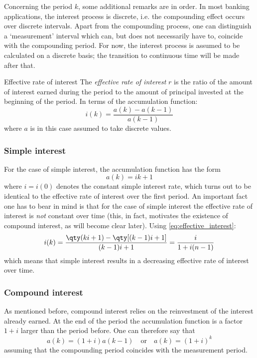 Concerning the period \(k\), some additional remarks are in order. In most banking applications, the interest process is discrete, i.e. the compounding effect occurs over discrete intervals. Apart from the compounding process, one can distinguish a `measurement' interval which can, but does not necessarily have to, coincide with the compounding period. For now, the interest process is assumed to be calculated on a discrete basis; the transition to continuous time will be made after that.

\begin{thmblock}{Effective rate of interest}
    The \emph{effective rate of interest} \(r\) is the ratio of the amount of interest earned during the period to the amount of principal invested at the beginning of the period. In terms of the accumulation function:
     \begin{equation}
         i(k) = \frac{a(k) - a(k-1)}{a(k-1)}
         \label{eq:effective_interest}
     \end{equation}
     where \(a\) is in this case assumed to take discrete values.
\end{thmblock}


\subsubsection{Simple interest}
For the case of simple interest, the accumulation function has the form
\[
     a(k) = ik + 1
\] 
where \(i = i(0)\) denotes the constant simple interest rate, which turns out to be identical to the effective rate of interest over the first period. An important fact one has to bear in mind is that for the case of simple interest the effective rate of interest is \emph{not} constant over time (this, in fact, motivates the existence of compound interest, as will become clear later). Using \cref{eq:effective_interest}:
\[
     i(k) = \frac{\qty(ki + 1) - \qty[(k-1)i + 1]}{(k-1)i + 1} = \frac{i}{1 + i(n-1)}
\]
which means that simple interest results in a decreasing effective rate of interest over time. \cite{Kellison1991}

\subsubsection{Compound interest}
As mentioned before, compound interest relies on the reinvestment of the interest already earned. At the end of the period the accumulation function is a factor \(1 + i\) larger than the period before. One can therefore say that
\[
     a(k) = (1 + i)a(k-1)\quad\text{or}\quad a(k) = (1 + i)^{k}
\]
assuming that the compounding period coincides with the measurement period. 

